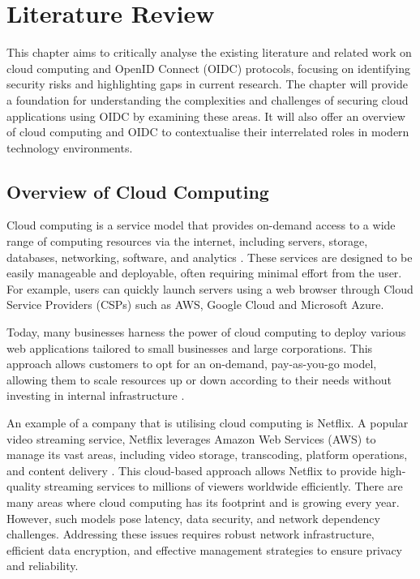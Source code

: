\chapter{Literature Review}

This chapter aims to critically analyse the existing literature and related work on cloud computing and OpenID Connect (OIDC) protocols, focusing on identifying security risks and highlighting gaps in current research. The chapter will provide a foundation for understanding the complexities and challenges of securing cloud applications using OIDC by examining these areas. It will also offer an overview of cloud computing and OIDC to contextualise their interrelated roles in modern technology environments.

\section{Overview of Cloud Computing}
Cloud computing is a service model that provides on-demand access to a wide range of computing resources via the internet, including servers, storage, databases, networking, software, and analytics \citep{rashid2019cloud}. These services are designed to be easily manageable and deployable, often requiring minimal effort from the user. For example, users can quickly launch servers using a web browser through Cloud Service Providers (CSPs) such as AWS, Google Cloud and Microsoft Azure. 

Today, many businesses harness the power of cloud computing to deploy various web applications tailored to small businesses and large corporations. This approach allows customers to opt for an on-demand, pay-as-you-go model, allowing them to scale resources up or down according to their needs without investing in internal infrastructure \citep{cloud_comp_example}.

An example of a company that is utilising cloud computing is Netflix. A popular video streaming service, Netflix leverages Amazon Web Services (AWS) to manage its vast areas, including video storage, transcoding, platform operations, and content delivery \citep{cloud_netflix}. This cloud-based approach allows Netflix to provide high-quality streaming services to millions of viewers worldwide efficiently. There are many areas where cloud computing has its footprint and is growing every year. However, such models pose latency, data security, and network dependency challenges. Addressing these issues requires robust network infrastructure, efficient data encryption, and effective management strategies to ensure privacy and reliability.

